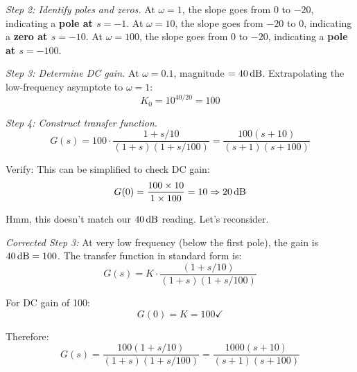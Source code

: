 \begin{example}
\textit{Step 2: Identify poles and zeros.}
At $\omega = 1$, the slope goes from $0$ to $-20$, indicating a \textbf{pole at $s = -1$}. At $\omega = 10$, the slope goes from $-20$ to $0$, indicating a \textbf{zero at $s = -10$}. At $\omega = 100$, the slope goes from $0$ to $-20$, indicating a \textbf{pole at $s = -100$}.

\textit{Step 3: Determine DC gain.}
At $\omega = 0.1$, magnitude $= 40\,\text{dB}$. Extrapolating the low-frequency asymptote to $\omega = 1$:
\begin{equation}
K_0 = 10^{40/20} = 100
\end{equation}

\textit{Step 4: Construct transfer function.}
\begin{equation}
G(s) = 100 \cdot \frac{1 + s/10}{(1 + s)(1 + s/100)} = \frac{100(s + 10)}{(s + 1)(s + 100)}
\end{equation}

Verify: This can be simplified to check DC gain:
\begin{equation}
G(0) = \frac{100 \times 10}{1 \times 100} = 10 \Rightarrow 20\,\text{dB}
\end{equation}

Hmm, this doesn't match our $40\,\text{dB}$ reading. Let's reconsider.

\textit{Corrected Step 3:}
At very low frequency (below the first pole), the gain is $40\,\text{dB} = 100$. The transfer function in standard form is:
\begin{equation}
G(s) = K \cdot \frac{(1 + s/10)}{(1 + s)(1 + s/100)}
\end{equation}

For DC gain of 100:
\begin{equation}
G(0) = K = 100 \checkmark
\end{equation}

Therefore:
\begin{equation}
\boxed{G(s) = \frac{100(1 + s/10)}{(1 + s)(1 + s/100)} = \frac{1000(s + 10)}{(s + 1)(s + 100)}}
\end{equation}
\end{example}

